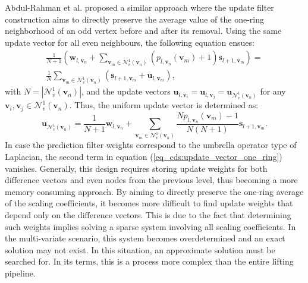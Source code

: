 \documentclass[graybox]{svmult}
\begin{document}
Abdul-Rahman et al. \cite{AbdulRahman2013} proposed a similar approach where the update filter construction aims to directly preserve the average value of the one-ring neighborhood of an odd vertex before and after its removal. Using the same update vector for all even neighbours, the following equation ensues:
\begin{eqnarray}
\frac{1}{ N + 1} \left( \mathbf{w}_{l, \mathbf{v}_n} + \sum\limits_{\mathbf{v}_m \in \mathcal{N}_v^1(\mathbf{v}_n) } { (  p_{l, \mathbf{v}_n}(\mathbf{v}_m) + 1 ) \mathbf{s}_{l+1, \mathbf{v}_m} } \right) = \\ \frac{1}{N} \sum\limits_{\mathbf{v}_m \in \mathcal{N}_v^1(\mathbf{v}_n) } { (  \mathbf{s}_{l+1, \mathbf{v}_m} + \mathbf{u}_{l,\mathbf{v}_m} ) } ,
\label{eq_cds:one_ring_average}
\end{eqnarray}
with $N = | \mathcal{N}_v^1(\mathbf{v}_n) |$, and the update vectors $\mathbf{u}_{l,\mathbf{v}_i} = \mathbf{u}_{l,\mathbf{v}_j} = \mathbf{u}_{\mathcal{N}_v^1(\mathbf{v}_n)} $ for any $\mathbf{v}_i, \mathbf{v}_j \in \mathcal{N}_v^1(\mathbf{v}_n)$. Thus, the uniform update vector is determined as:
\begin{equation}
\mathbf{ u}_{\mathcal{N}_v^1(\mathbf{v}_n)} = \frac{1}{N + 1} \mathbf{w}_{l, \mathbf{v}_n}  + \sum\limits_{\mathbf{v}_m \in \mathcal{N}_v^1(\mathbf{v}_n) } { \frac{ N  p_{l, \mathbf{v}_n}(\mathbf{v}_m) - 1 }{N (N +1 ) } \mathbf{s}_{l+1, \mathbf{v}_m} }.
\label{eq_cds:update_vector_one_ring}
\end{equation}
In case the prediction filter weights correspond to the umbrella operator type of Laplacian, the second term in equation (\ref{eq_cds:update_vector_one_ring}) vanishes. Generally, this design requires storing update weights for both difference vectors and even nodes from the previous level, thus becoming a more memory consuming approach.
By aiming to directly preserve the one-ring average of the scaling coefficients, it becomes more difficult to find update weights that depend only on the difference vectors. This is due to the fact that determining such weights implies solving a sparse system involving all scaling coefficients. In the multi-variate scenario, this system becomes overdetermined and an exact solution may not exist. In this situation, an approximate solution must be searched for. In its terms, this is a process more complex than the entire lifting pipeline.
\end{document}
